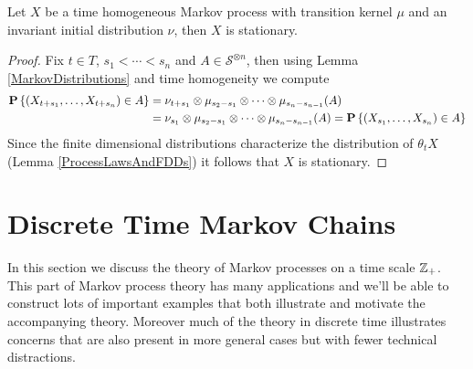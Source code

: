 \begin{lem}\label{InvarianceImpliesStationary}Let $X$ be a time
  homogeneous Markov process with transition kernel $\mu$ and an invariant initial distribution
  $\nu$, then $X$ is stationary.
\end{lem}
\begin{proof}
Fix $t \in T$, $s_1 < \dotsb < s_n$ and $A \in \mathcal{S}^{\otimes
  n}$, then using Lemma
\ref{MarkovDistributions} and time homogeneity we compute
\begin{align*}
\textbf{P}\left \{(X_{t + s_1}, \dotsc, X_{t + s_n}) \in A \right \} &= \nu_{t+s_1}
                                                         \otimes
                                                         \mu_{s_2 -
                                                         s_1} \otimes
                                                         \dotsm
                                                         \otimes
                                                         \mu_{s_n -
                                                         s_{n-1}}(A)
  \\
&=\nu_{s_1}
                                                         \otimes
                                                         \mu_{s_2 -
                                                         s_1} \otimes
                                                         \dotsm
                                                         \otimes
                                                         \mu_{s_n -
                                                         s_{n-1}}(A)
= \textbf{P}\left \{(X_{ s_1}, \dotsc, X_{s_n}) \in A \right \}
\end{align*}
Since the finite dimensional distributions characterize the
distribution of $\theta_t X$ (Lemma \ref{ProcessLawsAndFDDs}) it follows that $X$ is stationary.
\end{proof}


\section{Discrete Time Markov Chains}

In this section we discuss the theory of Markov processes on a time
scale $\mathbb{Z}_+$.  This part of Markov process theory has many
applications and we'll be able to construct lots of important examples
that both illustrate and motivate the accompanying theory.  Moreover
much of the theory in discrete time illustrates concerns that are also
present in more general cases but with fewer technical distractions.

